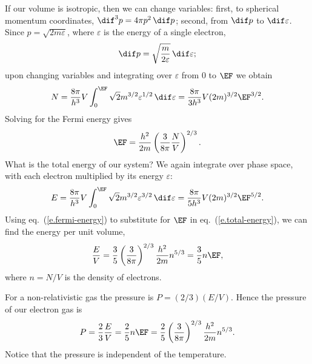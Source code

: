 If our volume is isotropic, then we can change variables: first, to spherical momentum coordinates, $\dif^{3}p = 4\pi p^{2}\,\dif p$; second, from $\dif p$ to $\dif\varepsilon$.  Since $p = \sqrt{2m\varepsilon}$, where $\varepsilon$ is the energy of a single electron,
\[
	\dif p = \sqrt{\frac{m}{2\varepsilon}}\,\dif \varepsilon;
\]
upon changing variables and integrating over $\varepsilon$ from $0$ to $\EF$ we obtain
\[
	N = \frac{8\pi}{h^{3}}V \int_{0}^{\EF} \sqrt{2}m^{3/2}\varepsilon^{1/2}\,\dif \varepsilon
	= \frac{8\pi}{3h^{3}} V (2m)^{3/2} \EF^{3/2}.
\]
Solving for the Fermi energy gives
\begin{equation}\label{e.fermi-energy}
	\EF = \frac{h^{2}}{2m}\left(\frac{3}{8\pi}\frac{N}{V}\right)^{2/3}.
\end{equation}
What is the total energy of our system? We again integrate over phase space, with each electron multiplied by its energy $\varepsilon$:
\begin{equation}\label{e.total-energy}
	E = \frac{8\pi}{h^{3}}V\int_{0}^{\EF}\sqrt{2}m^{3/2}\varepsilon^{3/2}\,\dif\varepsilon = \frac{8\pi}{5h^{3}}V(2m)^{3/2} \EF^{5/2}.
\end{equation}
Using eq.~(\ref{e.fermi-energy}) to substitute for $\EF$ in eq.~(\ref{e.total-energy}), we can find the energy per unit volume,
\[
	\frac{E}{V} = \frac{3}{5}\left(\frac{3}{8\pi}\right)^{2/3}\frac{h^{2}}{2m}n^{5/3} = \frac{3}{5} n \EF,
\]
where $n=N/V$ is the density of electrons.

For a non-relativistic gas the pressure is $P = (2/3)(E/V)$.  Hence the pressure of our electron gas is
\begin{equation}\label{e.pressure-electrons}
	P = \frac{2}{3}\frac{E}{V} = \frac{2}{5} n\EF
		= \frac{2}{5}\left(\frac{3}{8\pi}\right)^{2/3}\frac{h^{2}}{2m}n^{5/3}.
\end{equation}
Notice that the pressure is independent of the temperature.

